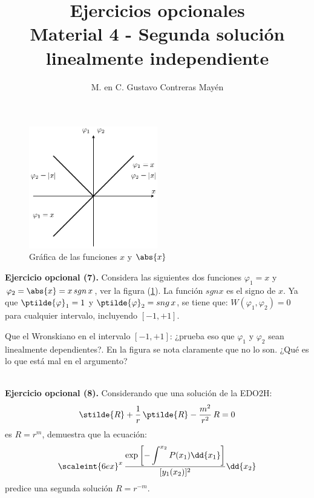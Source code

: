 
\usepackage{titling}
\setlength{\droptitle}{-3cm}
\title{Ejercicios opcionales \\[0.3em]  \large{Material 4 - Segunda solución linealmente independiente} \vspace{-3ex}}
\author{M. en C. Gustavo Contreras Mayén}
\date{ }



\vspace{-2in}
\maketitle
\fontsize{14}{14}\selectfont

\noindent

\begin{minipage}{\linewidth}
\begin{figure}
\begin{center}
    \includegraphics[width=0.5\textwidth]{Imagenes/Ejercicio_Opcional_07.eps}
\end{center}
\caption{Gráfica de las funciones $x$ y $\abs{x}$}
\label{fig:figura_09_03}
\end{figure}
\textbf{Ejercicio opcional (7). } Considera las siguientes dos funciones $\varphi_{1} = x$ y $\varphi_{2} = \abs{x} = x \, sgn \, x$, ver la figura (\ref{fig:figura_09_03}). La función $sgn x$ es el signo de $x$. Ya que $\ptilde{\varphi}_{1} = 1$ y $\ptilde{\varphi}_{2} = sng \, x$, se tiene que: $W(\varphi_{1}, \varphi_{2}) = 0$ para cualquier intervalo, incluyendo $[-1, +1]$.
\par
\noindent
Que el Wronskiano en el intervalo $[-1, +1]$: ¿prueba eso que $\varphi_{1}$ y $\varphi_{2}$ sean linealmente dependientes?. En la figura se nota claramente que no lo son. ¿Qué es lo que está mal en el argumento?
\end{minipage}
\\[1.5cm]
\textbf{Ejercicio opcional (8). } Considerando que una solución de la EDO2H:
\begin{align*}
\stilde{R} + \dfrac{1}{r} \, \ptilde{R} - \dfrac{m^{2}}{r^{2}} \, R = 0
\end{align*}
es $R = r^{m}$, demuestra que la ecuación:
\begin{align*}
\scaleint{6ex}^{x}  \, \dfrac{\exp \left[ \displaystyle - \int^{x_{2}} P(x_{1}) \dd{x_{1}} \right]}{[y_{1}(x_{2})]^{2}} \dd{x_{2}}
\end{align*}
predice una segunda solución $R = r^{-m}$.
